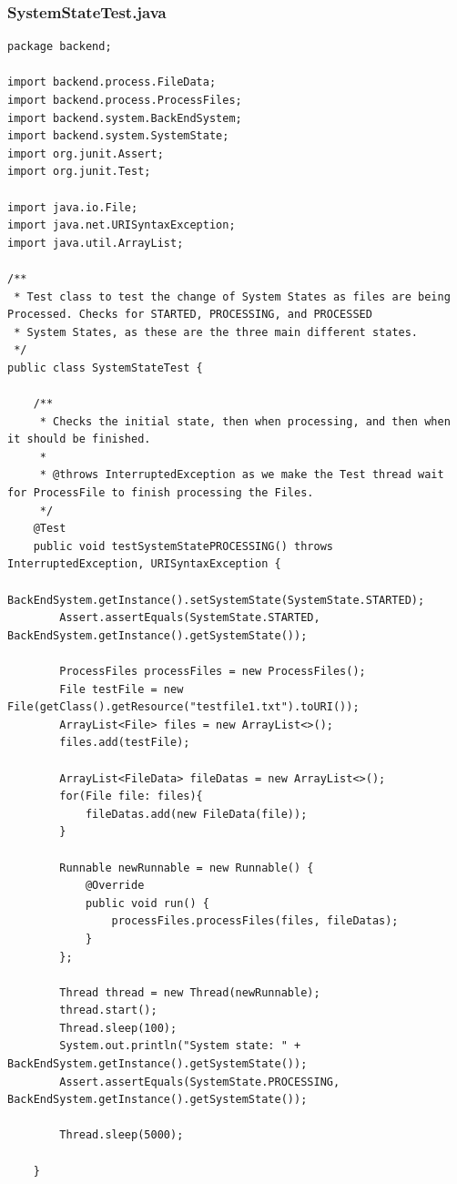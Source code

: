\subsubsection{SystemStateTest.java}
\begin{lstlisting}
package backend;

import backend.process.FileData;
import backend.process.ProcessFiles;
import backend.system.BackEndSystem;
import backend.system.SystemState;
import org.junit.Assert;
import org.junit.Test;

import java.io.File;
import java.net.URISyntaxException;
import java.util.ArrayList;

/**
 * Test class to test the change of System States as files are being Processed. Checks for STARTED, PROCESSING, and PROCESSED
 * System States, as these are the three main different states.
 */
public class SystemStateTest {

    /**
     * Checks the initial state, then when processing, and then when it should be finished.
     *
     * @throws InterruptedException as we make the Test thread wait for ProcessFile to finish processing the Files.
     */
    @Test
    public void testSystemStatePROCESSING() throws InterruptedException, URISyntaxException {
        BackEndSystem.getInstance().setSystemState(SystemState.STARTED);
        Assert.assertEquals(SystemState.STARTED, BackEndSystem.getInstance().getSystemState());

        ProcessFiles processFiles = new ProcessFiles();
        File testFile = new File(getClass().getResource("testfile1.txt").toURI());
        ArrayList<File> files = new ArrayList<>();
        files.add(testFile);

        ArrayList<FileData> fileDatas = new ArrayList<>();
        for(File file: files){
            fileDatas.add(new FileData(file));
        }

        Runnable newRunnable = new Runnable() {
            @Override
            public void run() {
                processFiles.processFiles(files, fileDatas);
            }
        };

        Thread thread = new Thread(newRunnable);
        thread.start();
        Thread.sleep(100);
        System.out.println("System state: " + BackEndSystem.getInstance().getSystemState());
        Assert.assertEquals(SystemState.PROCESSING, BackEndSystem.getInstance().getSystemState());

        Thread.sleep(5000);

    }



\end{lstlisting}

